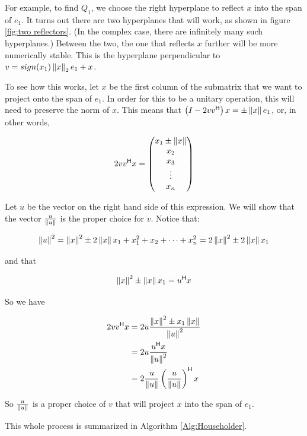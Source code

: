 For example, to find $Q_1$, we choose the right hyperplane to reflect $x$ into the span of $e_1$.
It turns out there are two hyperplanes that will work, as shown in figure \ref{fig:two reflectors}.
(In the complex case, there are infinitely many such hyperplanes.)
Between the two, the one that reflects $x$ further will be more numerically stable.
This is the hyperplane perpendicular to \textbf{$v = sign(x_1)\left\lVert x\right\rVert_2 e_1 + x$}.

To see how this works, let $x$ be the first column of the submatrix that we want to project onto the span of $e_1$.
In order for this to be a unitary operation, this will need to preserve the norm of $x$.
This means that $\left( I - 2 v v^\mathsf{H} \right) x = \pm \left\lVert x\right\rVert e_1$, or, in other words,

\[ 2 v v^\mathsf{H} x =
\begin{pmatrix}
x_1 \pm \left\lVert x\right\rVert \\
x_2 \\
x_3 \\
\vdots \\
x_n
\end{pmatrix}\]

Let $u$ be the vector on the right hand side of this expression.
We will show that the vector $\frac{u}{\left\lVert u\right\rVert}$ is the proper choice for $v$.
Notice that:

\[\left\lVert u\right\rVert^2 = \left\lVert x\right\rVert^2 \pm 2 \left\lVert x\right\rVert x_1 + x_1^2 + x_2 + \dots + x_n^2 = 2 \left\lVert x\right\rVert^2 \pm 2 \left\lVert x\right\rVert x_1 \]

and that

\[\left\lVert x\right\rVert^2 \pm \left\lVert x\right\rVert x_1 = u^\mathsf{H} x \]

So we have

\begin{align*}
2 v v^\mathsf{H} x &= 2 u \frac{\left\lVert x\right\rVert^2 \pm x_1 \left\lVert x\right\rVert}{\left\lVert u\right\rVert^2} \\
		&= 2 u \frac{u^\mathsf{H} x}{\left\lVert u\right\rVert^2} \\
		&= 2 \frac{u}{\left\lVert u\right\rVert} \left( \frac{u}{\left\lVert u\right\rVert} \right)^\mathsf{H} x
\end{align*}

So $\frac{u}{\left\lVert u\right\rVert}$ is a proper choice of $v$ that will project $x$ into the span of $e_1$.

This whole process is summarized in Algorithm \ref{Alg:Householder}.

